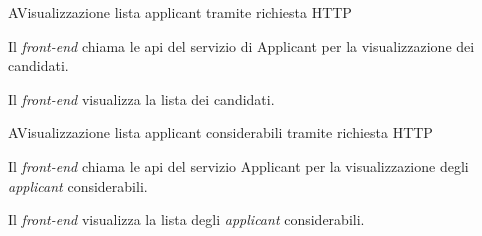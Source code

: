 \begin{usecase}{2}{A}{Visualizzazione lista applicant tramite richiesta HTTP}



	\begin{ucscenarioprincipale}
		\item Il \textit{front-end} chiama le \acrshort{api} del servizio di Applicant per la visualizzazione dei candidati.
		\item Il \textit{front-end} visualizza la lista dei candidati.
	\end{ucscenarioprincipale}


	\label{uc:vis-lista-applicant-http-a}
\end{usecase}

\begin{usecase}{2.1}{A}{Visualizzazione lista applicant considerabili tramite richiesta HTTP}



	\begin{ucscenarioprincipale}
		\item Il \textit{front-end} chiama le \acrshort{api} del servizio Applicant per la visualizzazione degli \textit{applicant} considerabili.
		\item Il \textit{front-end} visualizza la lista degli \textit{applicant} considerabili.
	\end{ucscenarioprincipale}


	\label{uc:vis-lista-applicant-considerable-http-a}
\end{usecase}

